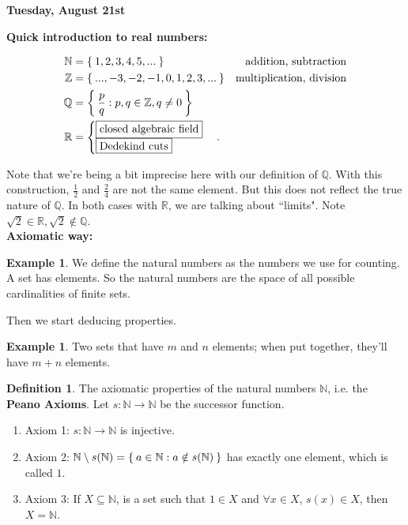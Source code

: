 \documentclass[12pt]{amsbook}
\theoremstyle{plain}
\numberwithin{section}{chapter}
\numberwithin{equation}{chapter}
\theoremstyle{definition}
\newtheorem{Def}[theorem]{Definition}
\newtheorem{Ex}[theorem]{Example}
\theoremstyle{remark}
\theoremstyle{plain}
\newcommand{\sub}{\subseteq}
\newcommand{\R}{\mathbb{R}}
\newcommand{\z}{\mathbb{Z}}
\newcommand{\n}{\mathbb{N}}
\newcommand{\Q}{\mathbb{Q}}
\newcommand{\bee}{\begin{equation}\begin{aligned}}
\newcommand{\eee}{\end{aligned}\end{equation}}
\newcommand{\fracc}{\frac}
\newcommand{\qwe}{\sqrt}
\begin{document}
\textbf{Tuesday, August 21st}

\textbf{Quick introduction to real numbers: }

\bee
\n &= \Set{1,2,3,4,5,...} & \text{addition, subtraction}\\
\z &= \Set{...,-3,-2,-1,0,1,2,3,...} & \text{multiplication, division}\\
\mathbb{Q} &= \Set{\fracc{p}{q}:p,q \in \z, q \neq 0}\\
\R &= 
\begin{cases}
\boxed{\text{closed algebraic field}}\\
\boxed{\text{Dedekind cuts}}
\end{cases}. 
\eee

Note that we're being a bit imprecise here with our definition of $\Q$. With this construction, $\fracc{1}{2}$ and $\fracc{2}{4}$ are not the same element. But this does not reflect the true nature of $\mathbb{Q}$. In both cases with $\R$, we are talking about ``limits". Note $\qwe{2} \in \R, \qwe{2} \notin \Q$. \\

\textbf{Axiomatic way: }


\begin{Ex}
We define the natural numbers as the numbers we use for counting. A set has  elements. So the natural numbers are the space of all possible cardinalities of finite sets. 
\end{Ex}

Then we start deducing properties. 

\begin{Ex}
Two sets that have $m$ and $n$ elements; when put together, they'll have $m + n$ elements. 
\end{Ex}


\begin{Def}
The axiomatic properties of the natural numbers $\n$, i.e. the \textbf{Peano Axioms}. Let $s: \n \to \n$ be the successor function. 
\begin{enumerate}
\item Axiom 1: $s: \n \to \n$ is injective. 
\item Axiom 2: $\n \setminus s(\n) = \Set{a \in \n: a \notin s(\n)}$ has exactly one element, which is called $1$. 
\item Axiom 3: If $X \sub \n$, is a set such that $1 \in X$ and $\forall x \in X$, $s(x) \in X$, then $X = \n$. 
\end{enumerate}
\end{Def}
\end{document}
